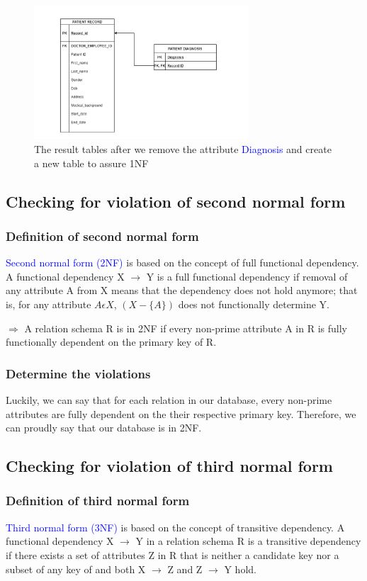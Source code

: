 \documentclass[a4paper]{article}
\numberwithin{equation}{section}
\begin{document}
\begin{figure}[H]
  \centering
  \includegraphics[width = 8cm ]{assets/1NFsolution2.PNG}
  \captionsetup{justification=centering,margin=2cm}
  \caption{The result tables after we remove the attribute \textcolor{blue}{Diagnosis} and create a new table to assure 1NF}
\end{figure}

\subsection{Checking for violation of second normal form}
\subsubsection{Definition of second normal form }
\textcolor{blue}{Second normal form (2NF)} is based on the concept of full functional dependency.
A functional dependency X \(\rightarrow \) Y is a full functional dependency if removal of any attribute A from X means that the dependency does not hold anymore; that is, for any attribute \(A \epsilon  X\), \((X - \{A\})\) does not functionally determine Y.

\(\Rightarrow \) A relation schema R is in 2NF if every non-prime attribute A in R is
fully functionally dependent on the primary key of R.

\subsubsection{Determine the violations}
Luckily, we can say that for each relation in our database, every non-prime attributes are fully dependent on the their respective primary key.
Therefore, we can proudly say that our database is in 2NF\@.

\subsection{Checking for violation of third normal form}
\subsubsection{Definition of third normal form}
\textcolor{blue}{Third normal form (3NF)} is based on the concept of transitive dependency.
A functional dependency X \(\rightarrow \) Y in a relation schema R is a transitive dependency if there exists a set of attributes Z in R that is neither a candidate key nor a subset of any key of  and both X \(\rightarrow \) Z and Z \(\rightarrow \) Y hold.
\end{document}
